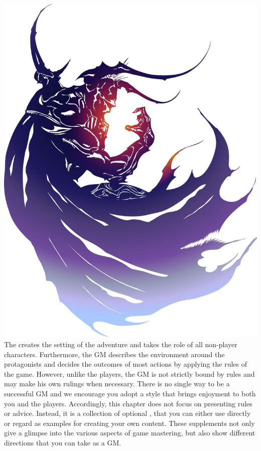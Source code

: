 %
\\\\
%
\includegraphics[width=\columnwidth]{./art/images/ff4.jpg}
%
\vfill
%
The  creates the setting of the adventure and takes the role of all non-player characters.
Furthermore, the GM describes the environment around the protagonists and decides the outcomes of most actions by applying the rules of the game. 
However, unlike the players, the GM is not strictly bound by rules and may make his own rulings when necessary.
There is no single way to be a successful GM and we encourage you adopt a style that brings enjoyment to both you and the players.
%
\vfill
%
Accordingly, this chapter does not focus on presenting rules or advice.
Instead, it is a collection of optional , that you can either use directly or regard as examples for creating your own content.
These supplements not only give a glimpse into the various aspects of game mastering, but also show different directions that you can take as a GM. 
